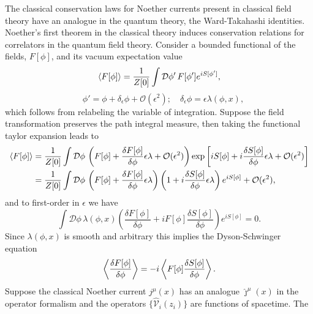 \documentclass[11pt, a4paper]{article}
\begin{document}
The classical conservation laws for Noether currents present in classical field theory
have an analogue in the quantum theory, the Ward-Takahashi identities.
Noether's first theorem in the classical theory induces
conservation relations for correlators in the quantum field theory.
Consider a bounded functional of the fields, $F[\phi]$, and its vacuum expectation value
\begin{equation}
  \braket{F[\phi]} = \frac{1}{Z[0]}\int{\mathcal{D}\phi'\,F[\phi']e^{iS[\phi']}},
\end{equation}
\begin{equation}
  \quad \phi' = \phi + \delta_\epsilon\phi +\mathcal{O}(\epsilon^2);
  \quad \delta_\epsilon\phi = \epsilon\lambda(\phi,x),
\end{equation}
which follows from relabeling the variable of integration. Suppose
the field transformation preserves the path integral measure, then
taking the functional taylor expansion leads to
\begin{equation}
  \begin{split}
  \braket{F[\phi]} & = \frac{1}{Z[0]}\int{\mathcal{D}\phi\,\left(F[\phi] +
    \frac{\delta F[\phi]}{\delta\phi}\epsilon\lambda +\mathcal{O}(\epsilon^2) \right)
    \exp{\left[ iS{[\phi]} + i\frac{\delta S[\phi]}{\delta\phi}\epsilon\lambda
  + \mathcal{O}(\epsilon^2) \right]}} \\
  & = \frac{1}{Z[0]}\int{\mathcal{D}\phi\,
    \left(F[\phi] + \frac{\delta F[\phi]}{\delta\phi}\epsilon\lambda \right)
    \left(1 + i\frac{\delta S[\phi]}{\delta\phi}\epsilon\lambda\right)e^{iS[\phi]} }
    + \mathcal{O}(\epsilon^2),
  \end{split}
\end{equation}
and to first-order in $\epsilon$ we have
\begin{equation}
 \int{\mathcal{D}\phi\,\lambda(\phi,x) \left(
    \frac{\delta F[\phi]}{\delta\phi} +
    iF[\phi]\frac{\delta S[\phi]}{\delta\phi} \right)e^{iS[\phi]} } = 0.
\end{equation}
Since $\lambda(\phi,x)$ is smooth and arbitrary this implies the
Dyson-Schwinger equation~\cite{DysonDSE,SchwingerDSE}
\begin{equation}
  \Braket{\frac{\delta F[\phi]}{\delta\phi}} = -i\Braket{F[\phi]\frac{\delta S[\phi]}{\delta\phi}}.
\end{equation}
Suppose the classical Noether current $j^\mu(x)$ has an analogue $\hat{\jmath}^\mu(x)$
in the operator formalism and the operators
$\{\widehat{\mathcal{V}}_i(z_i)\}$ are functions of spacetime. The 
\end{document}

